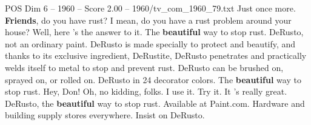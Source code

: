 \begin{textsample}{POS Dim 6 – 1960 – Score 2.00 – 1960/tv\_com\_1960\_79.txt}  \label{ex:f6_pos_021}
Just once more. \textbf{Friends}, do you have rust?
I mean, do you have a rust problem around your house?
Well, here 's the answer to it.
The \textbf{beautiful} way to stop rust.
DeRusto, not an ordinary paint.
DeRusto is made specially to protect and beautify, and thanks to its exclusive ingredient, DeRustite, DeRusto penetrates and practically welds itself to metal to stop and prevent rust.
DeRusto can be brushed on, sprayed on, or rolled on.
DeRusto in 24 decorator colors.
The \textbf{beautiful} way to stop rust.
Hey, Don!
Oh, no kidding, folks.
I use it.
Try it.
It 's really great.
DeRusto, the \textbf{beautiful} way to stop rust.
Available at Paint.com.
Hardware and building supply stores everywhere.
Insist on DeRusto.

\end{textsample}
